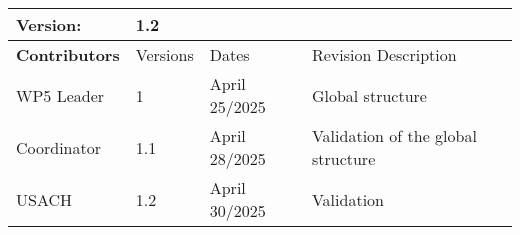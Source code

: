 \begin{tabular}{ >{\raggedright\arraybackslash}p{3cm}| p{2cm} p{4cm} p{6cm} }
    \toprule
    \textbf{Version}: & \multicolumn{3}{l}{ 1.2} \\ \midrule
    \textbf{Contributors}  & Versions    & Dates       & Revision Description \\ \midrule
    WP5 Leader  & 1    & April 25/2025  & Global structure  \\ 
    Coordinator  & 1.1    & April 28/2025  & Validation of the global structure  \\ 
    USACH  & 1.2   & April 30/2025  & Validation  \\ 
    \bottomrule
\end{tabular}  
